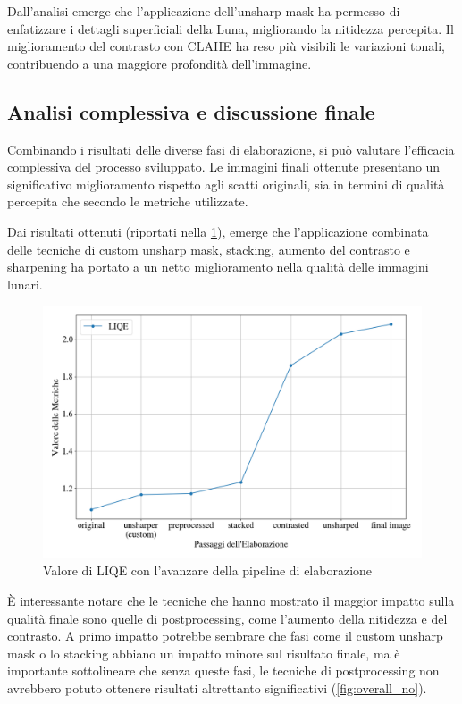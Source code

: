 Dall'analisi emerge che l'applicazione dell'unsharp mask ha permesso di enfatizzare i dettagli superficiali della Luna, migliorando la nitidezza percepita. Il miglioramento del contrasto con CLAHE ha reso più visibili le variazioni tonali, contribuendo a una maggiore profondità dell'immagine.

\subsection{Analisi complessiva e discussione finale}

Combinando i risultati delle diverse fasi di elaborazione, si può valutare l'efficacia complessiva del processo sviluppato. Le immagini finali ottenute presentano un significativo miglioramento rispetto agli scatti originali, sia in termini di qualità percepita che secondo le metriche utilizzate.


Dai risultati ottenuti (riportati nella \cref{fig:overall}), emerge che l'applicazione combinata delle tecniche di custom unsharp mask, stacking, aumento del contrasto e sharpening ha portato a un netto miglioramento nella qualità delle immagini lunari. 

\begin{figure}[H]
    \centering
    \includegraphics[width=0.8\linewidth]{../assets/overall.png}
    \caption{Valore di LIQE con l'avanzare della pipeline di elaborazione}
    \label{fig:overall}
\end{figure}

È interessante notare che le tecniche che hanno mostrato il maggior impatto sulla qualità finale sono quelle di postprocessing, come l'aumento della nitidezza e del contrasto. A primo impatto potrebbe sembrare che fasi come il custom unsharp mask o lo stacking abbiano un impatto minore sul risultato finale, ma è importante sottolineare che senza queste fasi, le tecniche di postprocessing non avrebbero potuto ottenere risultati altrettanto significativi (\cref{fig:overall_no}).

